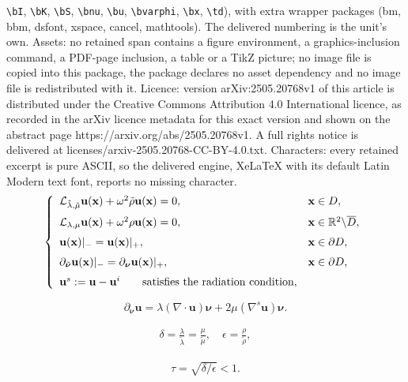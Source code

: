 \documentclass[10pt,a4paper]{amsart}
\newcommand{\bnu}{\bm{\nu}}
\newcommand{\bu}{\mathbf{u}}
\newcommand{\bx}{\mathbf{x}}
\newcommand{\td}{\tilde}
\begin{document}
\texttt{\textbackslash bI}, \texttt{\textbackslash bK}, \texttt{\textbackslash bS}, \texttt{\textbackslash bnu}, \texttt{\textbackslash bu}, \texttt{\textbackslash bvarphi}, \texttt{\textbackslash bx}, \texttt{\textbackslash td}), with extra wrapper packages (bm, bbm, dsfont, xspace, cancel, mathtools). The delivered numbering is the unit's own. Assets: no retained span contains a figure environment, a graphics-inclusion command, a PDF-page inclusion, a table or a TikZ picture; no image file is copied into this package, the package declares no asset dependency and no image file is redistributed with it. Licence: version arXiv:2505.20768v1 of this article is distributed under the Creative Commons Attribution 4.0 International licence, as recorded in the arXiv licence metadata for this exact version and shown on the abstract page https://arxiv.org/abs/2505.20768v1. A full rights notice is delivered at licenses/arxiv-2505.20768-CC-BY-4.0.txt. Characters: every retained excerpt is pure ASCII, so the delivered engine, XeLaTeX with its default Latin Modern text font, reports no missing character.
\begin{equation}\label{eq:xtm}
	\left\{
	\begin{array}{ll}
		\mathcal{L}_{\td{\lambda}, \td{\mu}}\bu(\bx) + \omega^2 \td{\rho} \bu(\bx) =0,  &  \bx\in D,  \medskip \\
		\mathcal{L}_{\lambda, \mu}\bu(\bx) + \omega^2\rho\bu(\bx) =0,   &   \bx\in \mathbb{R}^2\backslash \overline{D},  \medskip \\
		\bu(\bx)|_- = \bu(\bx)|_+,     & \bx\in\partial D,  \medskip \\
		\partial_{\td{\bnu}}\bu(\bx)|_- = \partial_{{\bnu}}\bu(\bx)|_+, & \bx\in\partial D,  \medskip \\
		\bu^s:=\bu-\bu^i  \qquad \mbox{satisfies the radiation condition},
	\end{array}
	\right.
\end{equation} 

\begin{equation}\label{eq:trac}
	\partial_{\bnu}\bu=\lambda(\nabla\cdot \bu)\bnu + 2\mu(\nabla^s\bu) \bnu.
\end{equation}

\begin{align}\label{eq:hicon}
	\delta  = \frac{\lambda}{\td{\lambda} }=\frac{\mu}{\td{\mu}}, \quad  \epsilon =\frac{\rho}{\td{\rho}} ,
\end{align}

\begin{align}\label{eq:de}
	\tau= \sqrt{\delta/\epsilon} < 1.
\end{align}
\end{document}
